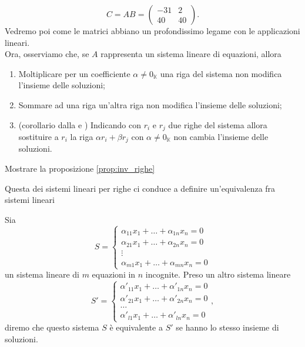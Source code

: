 $$
C = AB = \begin{pmatrix} -31 & 2 \\ 40 & 40 \end{pmatrix}.
$$
Vedremo poi come le matrici abbiano un profondissimo legame con le applicazioni lineari. \\
Ora, osserviamo che, se $A$ rappresenta un sistema lineare di equazioni, allora
\begin{prop} \hspace{1cm} \label{prop:inv_righe}
  \begin{enumerate}[label=\protect\circled{\arabic*}]
    \item Moltiplicare per un coefficiente $\alpha \neq 0_\mathbb{K}$ una riga del sistema non modifica l'insieme delle soluzioni;
    \item Sommare ad una riga un'altra riga non modifica l'insieme delle soluzioni;
    \item (corollario dalla  e ) Indicando con $r_i$ e $r_j$ due righe del sistema allora sostituire a $r_i$ la riga $\alpha r_i + \beta r_j$ con $\alpha \neq 0_{\mathbb{K}}$ non cambia l'insieme delle soluzioni.
  \end{enumerate}
\end{prop}
\begin{exercise}
  Mostrare la proposizione \ref{prop:inv_righe}
\end{exercise}
Questa dei sistemi lineari per righe ci conduce a definire un'equivalenza fra sistemi lineari
\begin{definition}
  Sia
  $$
  S = \begin{cases}
    \alpha_{11} x_1 + \ldots + \alpha_{1n} x_n = 0 \\
    \alpha_{21} x_1 + \ldots + \alpha_{2n} x_n = 0 \\
    \vdots \\
    \alpha_{m1} x_1 + \ldots + \alpha_{mn} x_n = 0
  \end{cases}
  $$
  un sistema lineare di $m$ equazioni in $n$ incognite. Preso un altro sistema lineare
  $$
  S' = \begin{cases}
    \alpha'_{11} x_1 + \ldots + \alpha'_{1n} x_n = 0 \\
    \alpha'_{21} x_1 + \ldots + \alpha'_{2n} x_n = 0 \\
    \ldots \\
    \alpha'_{l1} x_1 + \ldots + \alpha'_{ln} x_n = 0
  \end{cases},
  $$
  diremo che questo sistema $S$ è equivalente a $S'$ se hanno lo stesso insieme di soluzioni. 
\end{definition}


